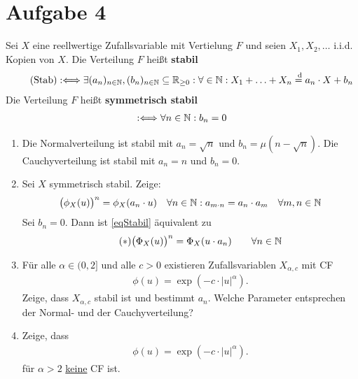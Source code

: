 \documentclass[12pt,a4paper]{article}
\begin{document}
\section*{Aufgabe 4}
Sei $X$ eine reellwertige Zufallsvariable mit Vertielung $F$ und seien $X_1,X_2,\ldots$ i.i.d. Kopien von $X$.
Die Verteilung $F$ heißt \textbf{stabil}
\begin{align}\label{eqStabil}\tag{Stab}
	:\Longleftrightarrow
	\exists(a_n)_{n\in\mathbb{N}},(b_n)_{n\in\mathbb{N}}\subseteq\mathbb{R}_{\geq0}:\forall\in\mathbb{N}:
	X_1+\ldots+X_n\overset{\text{ d}}{=}a_n\cdot X+b_n
\end{align}
Die Verteilung $F$ heißt \textbf{symmetrisch stabil}
\begin{align*}
	:\Longleftrightarrow
	\forall n\in\mathbb{N}:b_n=0
\end{align*}

\begin{enumerate}[label=\alph*)]
	\item Die Normalverteilung ist stabil mit $a_n=\sqrt{n}$ und $b_n=\mu(n-\sqrt{n})$.
	Die Cauchyverteilung ist stabil mit $a_n=n$ und $b_n=0$.
	\item Sei $X$ symmetrisch stabil.
	Zeige:
	\begin{align*}
		\big(\phi_X(u)\big)^n&=\phi_X(a_n\cdot u) & \forall n\in\mathbb{N}:
		a_{m\cdot n}&=a_n\cdot a_m &\forall m,n\in\mathbb{N}
	\end{align*}		
	Sei $b_n=0$. Dann ist \eqref{eqStabil} äquivalent zu
	\begin{align}\label{eq4Stern}\tag{$\ast$}
		\big(\Phi_X(u)\big)^n=\Phi_X(u\cdot a_n)\qquad\forall n\in\mathbb{N}
	\end{align}
	\item Für alle $\alpha\in(0,2]$ und alle $c>0$ existieren Zufallsvariablen $X_{\alpha,c}$ mit CF 
	\begin{align*}
		\phi(u)=\exp\left(-c\cdot|u|^\alpha\right).
	\end{align*}
	Zeige, dass $X_{\alpha,c}$ stabil ist und bestimmt $a_n$.
	Welche Parameter entsprechen der Normal- und der Cauchyverteilung?
	\item Zeige, dass
	\begin{align*}
		\phi(u)=\exp\left(-c\cdot|u|^\alpha\right).
	\end{align*}
	für $\alpha>2$ \ul{keine} CF ist.
\end{enumerate}
\end{document}

